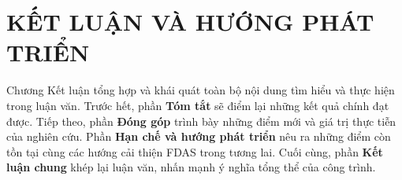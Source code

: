 
\chapter[ KẾT LUẬN ]{ KẾT LUẬN VÀ HƯỚNG PHÁT TRIỂN }
\label{chap:conclusion}

Chương Kết luận tổng hợp và khái quát toàn bộ nội dung tìm hiểu và thực hiện trong luận văn. 
Trước hết, phần \textbf{Tóm tắt} sẽ điểm lại những kết quả chính đạt được. 
Tiếp theo, phần \textbf{Đóng góp} trình bày những điểm mới và giá trị thực tiễn của nghiên cứu. 
Phần \textbf{Hạn chế và hướng phát triển} nêu ra những điểm còn tồn tại cùng các hướng cải thiện FDAS trong tương lai. 
Cuối cùng, phần \textbf{Kết luận chung} khép lại luận văn, nhấn mạnh ý nghĩa tổng thể của công trình. 





